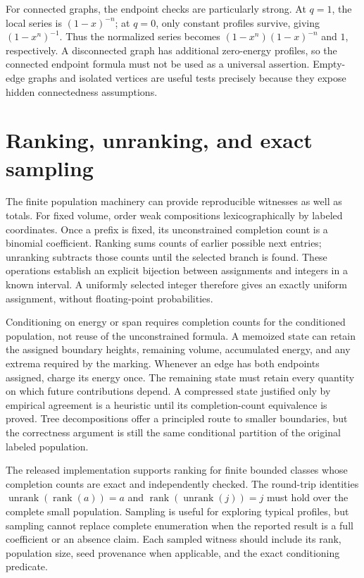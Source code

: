 \documentclass[
  11pt,
  a4paper,
]{report}
\let\singularitytexttt\texttt
\renewcommand{\texttt}[1]{\singularitytexttt{\seqsplit{#1}}}
\begin{document}
For connected graphs, the endpoint checks are particularly strong. At
\(q=1\), the local series is \((1-x)^{-n}\); at \(q=0\), only constant
profiles survive, giving \((1-x^n)^{-1}\). Thus the normalized series
becomes \((1-x^n)(1-x)^{-n}\) and \(1\), respectively. A disconnected
graph has additional zero-energy profiles, so the connected endpoint
formula must not be used as a universal assertion. Empty-edge graphs and
isolated vertices are useful tests precisely because they expose hidden
connectedness assumptions.

\hypertarget{ranking-unranking-and-exact-sampling}{%
\section{Ranking, unranking, and exact
sampling}\label{ranking-unranking-and-exact-sampling}}

The finite population machinery can provide reproducible witnesses as
well as totals. For fixed volume, order weak compositions
lexicographically by labeled coordinates. Once a prefix is fixed, its
unconstrained completion count is a binomial coefficient. Ranking sums
counts of earlier possible next entries; unranking subtracts those
counts until the selected branch is found. These operations establish an
explicit bijection between assignments and integers in a known interval.
A uniformly selected integer therefore gives an exactly uniform
assignment, without floating-point probabilities.

Conditioning on energy or span requires completion counts for the
conditioned population, not reuse of the unconstrained formula. A
memoized state can retain the assigned boundary heights, remaining
volume, accumulated energy, and any extrema required by the marking.
Whenever an edge has both endpoints assigned, charge its energy once.
The remaining state must retain every quantity on which future
contributions depend. A compressed state justified only by empirical
agreement is a heuristic until its completion-count equivalence is
proved. Tree decompositions offer a principled route to smaller
boundaries, but the correctness argument is still the same conditional
partition of the original labeled population.

The released \texttt{HeightPopulation} implementation supports ranking
for finite bounded classes whose completion counts are exact and
independently checked. The round-trip identities
\(\operatorname{unrank}(\operatorname{rank}(a))=a\) and
\(\operatorname{rank}(\operatorname{unrank}(j))=j\) must hold over the
complete small population. Sampling is useful for exploring typical
profiles, but sampling cannot replace complete enumeration when the
reported result is a full coefficient or an absence claim. Each sampled
witness should include its rank, population size, seed provenance when
applicable, and the exact conditioning predicate.
\end{document}
